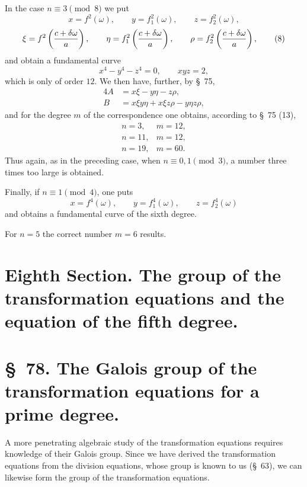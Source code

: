 \documentclass[11pt]{article}
\begin{document}
In the case $n\equiv3\pmod 8$ we put
\[
 x=f^2(\omega),\qquad y=f_1^2(\omega),\qquad z=f_2^2(\omega),
\]
\begin{equation}
 \xi=f^2\left({c+\delta\omega\over a}\right),\qquad
 \eta=f_1^2\left({c+\delta\omega\over a}\right),\qquad
 \rho=f_2^2\left({c+\delta\omega\over a}\right),
\tag{8}
\end{equation}
and obtain a fundamental curve
\begin{equation}
 x^4-y^4-z^4=0,
 \qquad
 xyz=2,
\tag{9}
\end{equation}
which is only of order $12$. We then have, further, by \S~75,
\begin{equation}
\begin{aligned}
4A&=x\xi-y\eta-z\rho,\\
B&=x\xi y\eta+x\xi z\rho-y\eta z\rho,
\end{aligned}
\tag{10}
\end{equation}
and for the degree $m$ of the correspondence one obtains, according to \S~75 (13),
\[
\begin{array}{c|c}
 n=3,&m=12,\\
 n=11,&m=12,\\
 n=19,&m=60.
\end{array}
\]
Thus again, as in the preceding case, when $n\equiv0,1\pmod 3$, a number three times too large is obtained.

Finally, if $n\equiv1\pmod4$, one puts
\[
 x=f^4(\omega),\qquad y=f_1^4(\omega),\qquad z=f_2^4(\omega)
\]
and obtains a fundamental curve of the sixth degree.

For $n=5$ the correct number $m=6$ results.

\section*{Eighth Section. The group of the transformation equations and the equation of the fifth degree.}

\section*{\S~78. The Galois group of the transformation equations for a prime degree.}

A more penetrating algebraic study of the transformation equations requires knowledge of their Galois group. Since we have derived the transformation equations from the division equations, whose group is known to us (\S~63), we can likewise form the group of the transformation equations.
\end{document}
